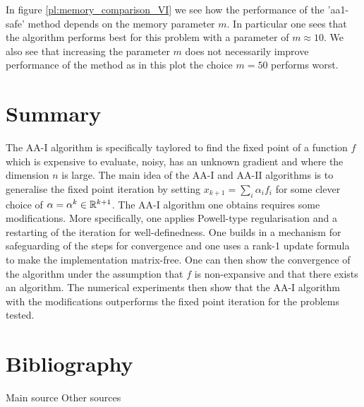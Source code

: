 In figure \ref{pl:memory_comparison_VI}  we see how the performance of the 'aa1-safe' method depends on the memory parameter $m$. In particular one sees that the algorithm performs best for this problem with a parameter of $m\approx10$. We also see that increasing the parameter $m$ does not necessarily improve performance of the method as in this plot the choice $m=50$ performs worst.


\section{Summary}

The AA-I algorithm is specifically taylored to find the fixed point of a function $f$ which is expensive to evaluate, noisy, has an unknown gradient and where the dimension $n$ is large. The main idea of the AA-I and AA-II algorithms is to generalise the fixed point iteration by setting $x_{k+1}=\sum_i\alpha_if_i$ for some clever choice of $\alpha=\alpha^k\in\mathbb{R}^{k+1}$. The AA-I algorithm one obtains requires some modifications. More specifically, one applies Powell-type regularisation and a restarting of the iteration for well-definedness. One builds in a mechanism for safeguarding of the steps for convergence and one uses a rank-1 update formula to make the implementation matrix-free. One can then show the convergence of the algorithm under the assumption that $f$ is non-expansive and that there exists an algorithm. The numerical experiments then show that the AA-I algorithm with the modifications outperforms the fixed point iteration for the problems tested.



\newpage
\section*{Bibliography}
\nocite{*}
Main source
\printbibliography[heading=none, keyword={main}]
\noindent Other sources
\printbibliography[heading=none, keyword={secondary}]


